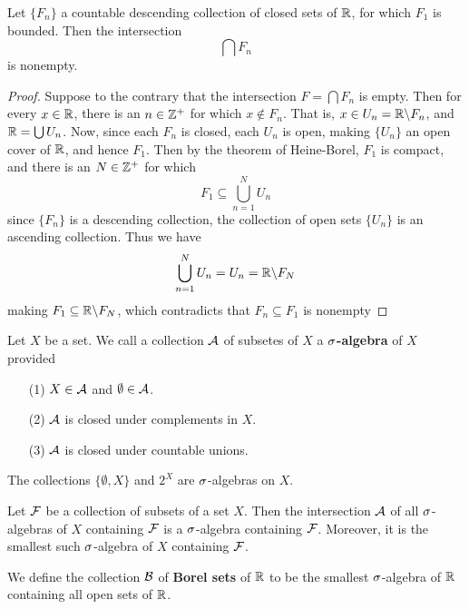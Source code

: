 \begin{theorem}\label{1.2.6}
    Let $\{F_n\}$ a countable descending collection of closed sets of $\mathbb{R}$, for
    which  $F_1$ is bounded. Then the intersection
    \begin{equation*}
        \bigcap{F_n}
    \end{equation*}
    is nonempty.
\end{theorem}
\begin{proof}
    Suppose to the contrary that the intersection $F=\bigcap{F_n}$ is empty.
    Then for every  $x \in \mathbb{R}$, there is an  $n \in \mathbb{Z}^+$ for which  $x \notin
    F_n$. That is,  $x \in U_n=\mathbb{R} \backslash F_n$, and $\mathbb{R}=\bigcup{U_n}$. Now, since
    each $F_n$ is closed, each  $U_n$ is open, making  $\{U_n\}$ an open cover
    of $\mathbb{R}$, and hence  $F_1$. Then by the theorem of Heine-Borel, $F_1$ is
    compact, and there is an $N \in \mathbb{Z}^+$ for which
    \begin{equation*}
        F_1 \subseteq \bigcup_{n=1}^N{U_n}
    \end{equation*}
    since $\{F_n\}$ is a descending collection, the collection of open sets
    $\{U_n\}$ is an ascending collection. Thus we have
    \begin{equation*}
        \bigcup_{n=1}^N{U_n}=U_n=\mathbb{R} \backslash F_N
    \end{equation*}
    making $F_1 \subseteq \mathbb{R} \backslash F_N$, which contradicts that $F_n \subseteq
    F_1$ is nonempty
\end{proof}

\begin{definition}
    Let $X$ be a set. We call a collection  $\mathcal{A}$ of subsetes of  $X$ a
    \textbf{$\sigma$-algebra} of $X$ provided
    \begin{enumerate}
        \item[(1)] $X \in \mathcal{A}$ and  $\emptyset \in \mathcal{A}$.

        \item[(2)] $\mathcal{A}$ is closed under complements in  $X$.

        \item[(3)] $\mathcal{A}$ is closed under countable unions.
    \end{enumerate}
\end{definition}

\begin{example}\label{example_1.2}
    The collections $\{\emptyset,X\}$ and $2^X$ are  $\sigma$-algebras on  $X$.
\end{example}

\begin{lemma}\label{1.2.7}
    Let $\mathcal{F}$ be a collection of subsets of a set  $X$. Then the intersection
    $\mathcal{A}$ of all  $\sigma$-algebras of  $X$ containing  $\mathcal{F}$ is a  $\sigma$-algebra
    containing  $\mathcal{F}$. Moreover, it is the smallest such  $\sigma$-algebra of $X$
    containing  $\mathcal{F}$.
\end{lemma}

\begin{definition}
    We define the collection $\mathcal{B}$ of \textbf{Borel sets} of $\mathbb{R}$ to be the
    smallest  $\sigma$-algebra of  $\mathbb{R}$ containing all open sets of  $\mathbb{R}$.
\end{definition}
